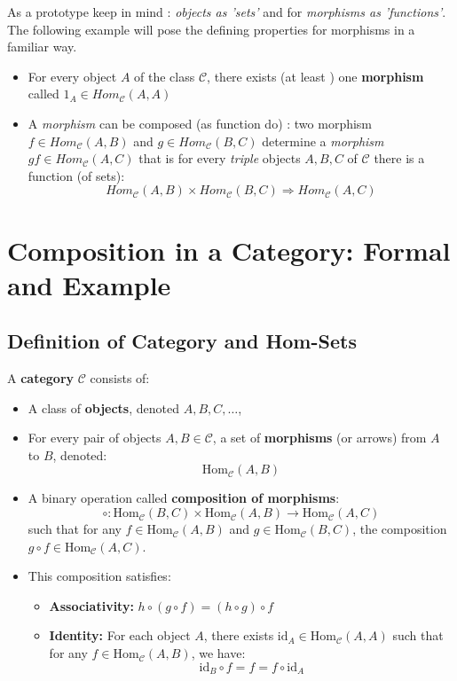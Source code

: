 \documentclass[10pt]{article}
\theoremstyle{plain}
\theoremstyle{definition}
\begin{document}
As a prototype keep in mind : \textit{objects as 'sets'} and for \textit{morphisms as 'functions'}. The following example will pose the defining properties for morphisms in a familiar way.

\begin{itemize}
	\item For every object $A$ of the class $\mathcal{C}$, there exists (at least ) one \textbf{morphism} called $1_A \in Hom_\mathcal{C} (A,A)$
	\item A \textit{morphism} can be composed (as function do) : two morphism $f \in Hom_\mathcal{C} (A,B)$ and $g \in Hom_\mathcal{C} (B,C)$ determine a \textit{morphism} $gf \in Hom_\mathcal{C} (A,C)$ that is for every \textit{triple} objects $A,B,C$ of $\mathcal{C}$ there is a function (of sets):
	$$Hom_\mathcal{C} (A,B) \times Hom_\mathcal{C} (B,C) \Rightarrow Hom_\mathcal{C} (A,C)$$
\end{itemize}
\section*{Composition in a Category: Formal and Example}

\subsection*{Definition of Category and Hom-Sets}

A \textbf{category} \( \mathcal{C} \) consists of:
\begin{itemize}
	\item A class of \textbf{objects}, denoted \( A, B, C, \dots \),
	\item For every pair of objects \( A, B \in \mathcal{C} \), a set of \textbf{morphisms} (or arrows) from \( A \) to \( B \), denoted:
	\[
	\text{Hom}_\mathcal{C}(A, B)
	\]
	\item A binary operation called \textbf{composition of morphisms}:
	\[
	\circ : \text{Hom}_\mathcal{C}(B, C) \times \text{Hom}_\mathcal{C}(A, B) \to \text{Hom}_\mathcal{C}(A, C)
	\]
	such that for any \( f \in \text{Hom}_\mathcal{C}(A, B) \) and \( g \in \text{Hom}_\mathcal{C}(B, C) \), the composition \( g \circ f \in \text{Hom}_\mathcal{C}(A, C) \).
	\item This composition satisfies:
	\begin{itemize}
		\item \textbf{Associativity:} \( h \circ (g \circ f) = (h \circ g) \circ f \)
		\item \textbf{Identity:} For each object \( A \), there exists \( \text{id}_A \in \text{Hom}_\mathcal{C}(A, A) \) such that for any \( f \in \text{Hom}_\mathcal{C}(A, B) \), we have:
		\[
		\text{id}_B \circ f = f = f \circ \text{id}_A
		\]
	\end{itemize}
\end{itemize}
\end{document}
